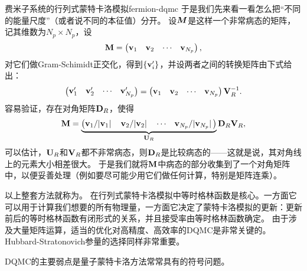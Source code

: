\begin{back}{费米子系统的行列式蒙特卡洛模拟}{fermion-dqmc}
    于是我们先来看一看怎么把“不同的能量尺度”（或者说不同的本征值）分开。
    设$\vb*{M}$是这样一个非常病态的矩阵，记其维数为$N_p \times N_p$，设
    \begin{equation}
        \vb{M} = \pmqty{\vb{v}_1 & \vb{v}_2 & \cdots & \vb{v}_{N_p}},
    \end{equation}
    对它们做Gram-Schimidt正交化，得到$\{\vb{v}_i'\}$，并设两者之间的转换矩阵由下式给出：
    \begin{equation}
        \pmqty{\vb{v}'_1 & \vb{v}'_2 & \cdots & \vb{v}'_{N_p}} = \pmqty{\vb{v}_1 & \vb{v}_2 & \cdots & \vb{v}_{N_p}} \vb{V}_R^{-1}.
    \end{equation}
    容易验证，存在对角矩阵$\vb{D}_R$，使得
    \begin{equation}
        \vb{M} = \underbrace{\pmqty{\vb{v}_1 / \abs*{\vb{v}_1} & \vb{v}_2 / \abs*{\vb{v}_2} & \cdots & \vb{v}_{N_p} / \abs*{\vb{v}_{N_p}}}}_{\vb{U}_R} \vb{D}_R \vb{V}_R,
    \end{equation}
    可以估计，$\vb{U}_R$和$\vb{V}_R$都不非常病态，则$\vb{D}_R$是比较病态的——这就是说，其对角线上的元素大小相差很大。
    于是我们就将$\vb{M}$中病态的部分收集到了一个对角矩阵中，以便妥善处理（例如要尽可能少用它们做任何计算，特别是矩阵连乘）。

    以上整套方法就称为。
    在行列式蒙特卡洛模拟中等时格林函数是核心。一方面它可以用于计算我们想要的所有物理量，一方面它决定了蒙特卡洛模拟的更新：更新前后的等时格林函数有闭形式的关系，并且接受率由等时格林函数确定。
    由于涉及大量矩阵运算，适当的优化对高精度、高效率的DQMC是非常关键的。
    Hubbard-Stratonovich参量的选择同样非常重要。
    
    DQMC的主要弱点是量子蒙特卡洛方法常常具有的符号问题。
\end{back}